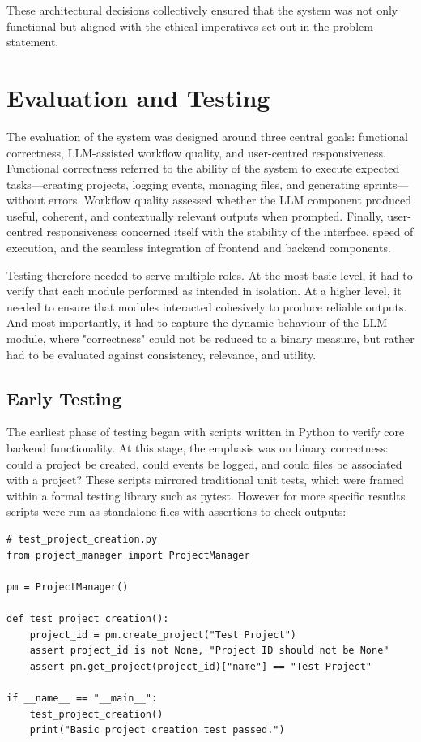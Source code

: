 \documentclass{report}
\begin{document}
These architectural decisions collectively ensured that the system was not only functional but aligned with the ethical imperatives set out in the problem statement.

\chapter{Evaluation and Testing}  
The evaluation of the system was designed around three central goals: functional correctness, LLM-assisted workflow quality, and user-centred responsiveness.
Functional correctness referred to the ability of the system to execute expected tasks—creating projects, logging events, managing files, and generating sprints—without errors. 
Workflow quality assessed whether the LLM component produced useful, coherent, and contextually relevant outputs when prompted. 
Finally, user-centred responsiveness concerned itself with the stability of the interface, speed of execution, and the seamless integration of frontend and backend components.

Testing therefore needed to serve multiple roles. At the most basic level, it had to verify that each module performed as intended in isolation. 
At a higher level, it needed to ensure that modules interacted cohesively to produce reliable outputs. 
And most importantly, it had to capture the dynamic behaviour of the LLM module, where "correctness" could not be reduced to a binary measure, but rather had to be evaluated against consistency, relevance, and utility.

\section{Early Testing}

The earliest phase of testing began with scripts written in Python to verify core backend functionality. 
At this stage, the emphasis was on binary correctness: could a project be created, could events be logged, and could files be associated with a project? 
These scripts mirrored traditional unit tests, which were framed within a formal testing library such as pytest. 
However for more specific resutlts scripts were run as standalone files with assertions to check outputs:


\begin{lstlisting}[style=pythonstyle]
    # test_project_creation.py
from project_manager import ProjectManager

pm = ProjectManager()

def test_project_creation():
    project_id = pm.create_project("Test Project")
    assert project_id is not None, "Project ID should not be None"
    assert pm.get_project(project_id)["name"] == "Test Project"

if __name__ == "__main__":
    test_project_creation()
    print("Basic project creation test passed.")
\end{lstlisting}
\end{document}
